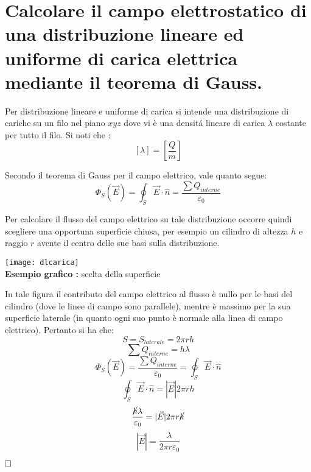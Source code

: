 \section{Calcolare il campo elettrostatico di una distribuzione
    	lineare ed uniforme di carica elettrica mediante il teorema di
    	Gauss.}
Per distribuzione lineare e uniforme di carica si intende una distribuzione di cariche su un filo nel piano $xyz$ dove vi \`e una densit\'a lineare di carica $\lambda$ costante per tutto il filo.
Si noti che :
$$ \left[\lambda\right] =  \left[\frac{Q}{m}\right] $$
   
Secondo il teorema di Gauss per il campo elettrico, vale quanto segue:
\begin{displaymath}
    \Phi_S\left(\vec{E}\right) = \oint_{S}{\vec{E} \cdot \hat{n}} = \frac{\sum{Q_{interne}}}{\varepsilon_0}
\end{displaymath}
    
Per calcolare il flusso del campo elettrico su tale distribuzione occorre quindi scegliere una opportuna superficie chiusa, per esempio un cilindro di altezza $h$ e raggio $r$ avente il centro delle sue basi sulla distribuzione.	
    
\begin{center}
	\texttt{[image: dlcarica]}\\
	\textbf{Esempio grafico :} scelta della superficie
\end{center}
    
\pagebreak
In tale figura il contributo del campo elettrico al flusso \`e nullo per le basi del cilindro (dove le linee di campo sono parallele), mentre \`e massimo per la sua superficie laterale (in quanto ogni suo punto \`e normale alla linea di campo elettrico). Pertanto si ha che:
$$ S = S_{laterale} = 2 \pi r h $$
$$ \sum{Q_{interne}} = h\lambda $$
$$ \Phi_S\left(\vec{E}\right) = \frac{\sum{Q_{interne}}}{\varepsilon_0} = \oint_{S}{\vec{E} \cdot \hat{n}} $$
$$ \oint_{S}{\vec{E} \cdot \hat{n}} = |\vec{E}| 2\pi rh $$
$$ \frac{\cancel{h} \lambda}{\varepsilon_0} = |\vec{E}| 2\pi r \cancel{h} $$
$$ |\vec{E}| = \frac{\lambda}{2 \pi r \varepsilon_0} $$
	
$\hfill\square$